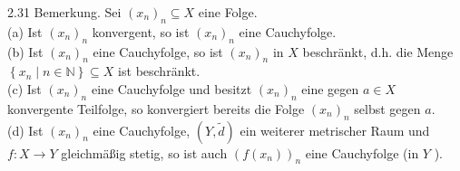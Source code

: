\documentclass[10pt, letterpaper]{article}
\begin{document}
2.31 Bemerkung. Sei $\left(x_{n}\right)_{n} \subseteq X$ eine Folge.\\
(a) Ist $\left(x_{n}\right)_{n}$ konvergent, so ist $\left(x_{n}\right)_{n}$ eine Cauchyfolge.\\
(b) Ist $\left(x_{n}\right)_{n}$ eine Cauchyfolge, so ist $\left(x_{n}\right)_{n}$ in $X$ beschränkt, d.h. die Menge $\left\{x_{n} \mid n \in \mathbb{N}\right\} \subseteq X$ ist beschränkt.\\
(c) Ist $\left(x_{n}\right)_{n}$ eine Cauchyfolge und besitzt $\left(x_{n}\right)_{n}$ eine gegen $a \in X$ konvergente Teilfolge, so konvergiert bereits die Folge $\left(x_{n}\right)_{n}$ selbst gegen $a$.\\
(d) Ist $\left(x_{n}\right)_{n}$ eine Cauchyfolge, $(Y, \tilde{d})$ ein weiterer metrischer Raum und $f: X \rightarrow Y$ gleichmäßig stetig, so ist auch $\left(f\left(x_{n}\right)\right)_{n}$ eine Cauchyfolge (in $Y$ ).\\
\end{document}
